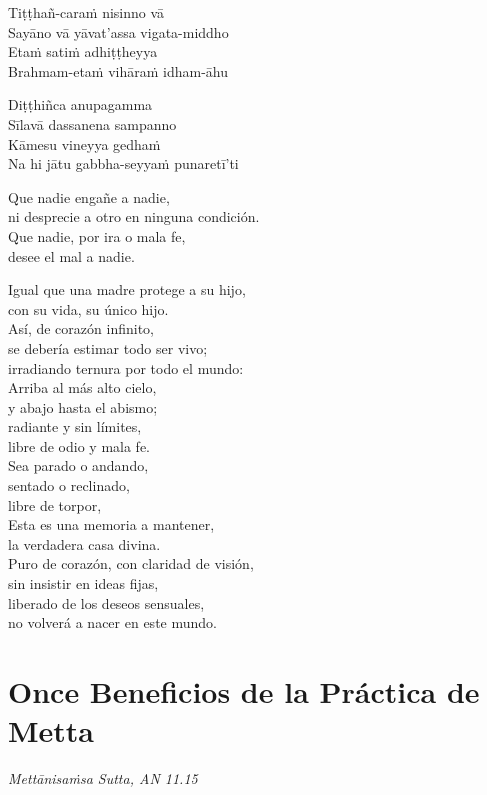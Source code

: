 Tiṭṭhañ-caraṁ nisinno vā\\
Sayāno vā yāvat'assa vigata-middho\\
Etaṁ satiṁ adhiṭṭheyya\\
Brahmam-etaṁ vihāraṁ idham-āhu

Diṭṭhiñca anupagamma\\
Sīlavā dassanena sampanno\\
Kāmesu vineyya gedhaṁ\\
Na hi jātu gabbha-seyyaṁ punaretī'ti

\clearpage

Que nadie engañe a nadie,\\
ni desprecie a otro en ninguna condición.\\
Que nadie, por ira o mala fe,\\
desee el mal a nadie.

Igual que una madre protege a su hijo,\\
con su vida, su único hijo.\\
Así, de corazón infinito,\\
se debería estimar todo ser vivo;\\
irradiando ternura por todo el mundo:\\
Arriba al más alto cielo,\\
y abajo hasta el abismo;\\
radiante y sin límites,\\
libre de odio y mala fe.\\
Sea parado o andando,\\
sentado o reclinado,\\
libre de torpor,\\
Esta es una memoria a mantener,\\
la verdadera casa divina.\\

Puro de corazón, con claridad de visión,\\
sin insistir en ideas fijas,\\
liberado de los deseos sensuales,\\
no volverá a nacer en este mundo.

\chapter[Once Beneficios]{Once Beneficios de la Práctica de Metta}

\emph{Mettānisaṁsa Sutta, AN 11.15}


